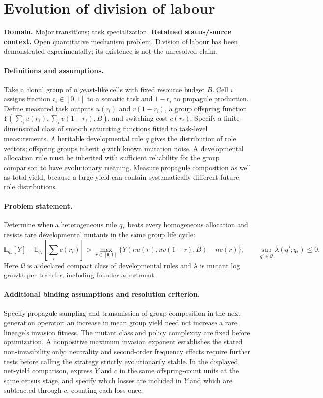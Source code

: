 \documentclass[11pt]{article}
\begin{document}
\section*{Evolution of division of labour}
\label{prob:152}
\label{rank:153}
\par\smallskip

\noindent\textbf{Domain.} Major transitions; task specialization. \quad \textbf{Retained status/source context.} Open quantitative mechanism problem. Division of labour has been demonstrated experimentally; its existence is not the unresolved claim.
\paragraph{Definitions and assumptions.} Take a clonal group of $n$ yeast-like cells with fixed resource budget $B$. Cell $i$ assigns fraction $r_i\in[0,1]$ to a somatic task and $1-r_i$ to propagule production. Define measured task outputs $u(r_i)$ and $v(1-r_i)$, a group offspring function $Y(\sum_i u(r_i),\sum_i v(1-r_i),B)$, and switching cost $c(r_i)$. Specify a finite-dimensional class of smooth saturating functions fitted to task-level measurements. A heritable developmental rule $q$ gives the distribution of role vectors; offspring groups inherit $q$ with known mutation noise. A developmental allocation rule must be inherited with sufficient reliability for the group comparison to have evolutionary meaning. Measure propagule composition as well as total yield, because a large yield can contain systematically different future role distributions.
\paragraph{Problem statement.} Determine when a heterogeneous rule $q_*$ beats every homogeneous allocation and resists rare developmental mutants in the same group life cycle:
\[
 \mathbb{E}_{q_*}[Y]-\mathbb{E}_{q_*}\!\left[\sum_i c(r_i)\right]
 >\max_{r\in[0,1]}\{Y(nu(r),nv(1-r),B)-nc(r)\},
 \qquad \sup_{q'\in\mathcal Q}\lambda(q';q_*)\le0.
\]
Here $\mathcal Q$ is a declared compact class of developmental rules and $\lambda$ is mutant log growth per transfer, including founder assortment.
\paragraph{Additional binding assumptions and resolution criterion.} Specify propagule sampling and transmission of group composition in the next-generation operator; an increase in mean group yield need not increase a rare lineage's invasion fitness. The mutant class and policy complexity are fixed before optimization. A nonpositive maximum invasion exponent establishes the stated non-invasibility only; neutrality and second-order frequency effects require further tests before calling the strategy strictly evolutionarily stable. In the displayed net-yield comparison, express $Y$ and $c$ in the same offspring-count units at the same census stage, and specify which losses are included in $Y$ and which are subtracted through $c$, counting each loss once.
\end{document}
